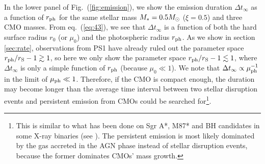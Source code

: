 \documentclass[useAMS,usenatbib]{mn2e}
\begin{document}
In the lower panel of Fig.~(\ref{fig:emission}), we show the emission
duration $\Delta 
t_{\infty}$ as a function of $r_{\rm ph}$ for the same stellar mass
$M_* = 0.5M_{\rm \odot}$ ($\xi = 0.5$) and three CMO
masses. From eq.~(\ref{eq:43}), we see that $\Delta t_{\infty}$ is a
function of both the hard surface radius $r_0$ (or $\mu_0$) and
the photospheric radius $r_{\rm ph}$. As we show in section
\ref{sec:rate}, observations from PS1 have already ruled out the
parameter space $r_{\rm ph}/r_{\rm S} - 1 \gtrsim 1$, so here we only
show the parameter space $r_{\rm ph}/r_{\rm S} - 1 
\lesssim 1$, where $\Delta t_{\infty}$ is only a simple function of
$r_{\rm ph}$ (because $\mu_0\ll 1$).
We note that $\Delta t_{\rm \infty}\propto \mu_{\rm ph}^{-1}$ in
the limit of $\mu_{\rm ph} \ll 1$. Therefore, if the CMO
is compact enough, the duration may become longer than the average
time interval between two stellar disruption events and persistent
emission from CMOs could be searched for\footnote{This is similar to
  what has been done on Sgr A*, M87* and BH candidates in some X-ray  
  binaries (see \citealt{nar97, 2007CQGra..24..659B, 2008NewAR..51..733N, 2009ApJ...701.1357B,
    2015ApJ...805..179B}). The persistent emission is most likely
  dominated by the gas accreted in the AGN phase instead of stellar
  disruption events, because the former dominates CMOs' mass growth.}.
\end{document}
